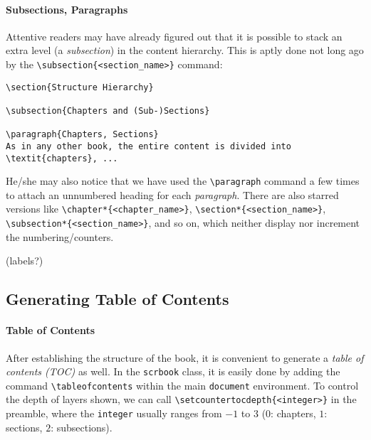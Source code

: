 \paragraph{Subsections, Paragraphs}
Attentive readers may have already figured out that it is possible to stack an extra level (a \textit{subsection}) in the content hierarchy. This is aptly done not long ago by the \texttt{\textbackslash subsection\{<section\_name>\}} command:
\begin{lstlisting}
\section{Structure Hierarchy}

\subsection{Chapters and (Sub-)Sections}

\paragraph{Chapters, Sections}
As in any other book, the entire content is divided into \textit{chapters}, ...
\end{lstlisting}
He/she may also notice that we have used the \texttt{\textbackslash paragraph} command a few times to attach an unnumbered heading for each \textit{paragraph}. There are also starred versions like \texttt{\textbackslash chapter*\{<chapter\_name>\}}, \texttt{\textbackslash section*\{<section\_name>\}}, \texttt{\textbackslash subsection*\{<section\_name>\}}, and so on, which neither display nor increment the numbering/counters.

(labels?)

\subsection{Generating Table of Contents}

\paragraph{Table of Contents}
After establishing the structure of the book, it is convenient to generate a \textit{table of contents (TOC)} as well. In the \verb|scrbook| class, it is easily done by adding the command \texttt{\textbackslash tableofcontents} within the main \verb|document| environment. To control the depth of layers shown, we can call \texttt{\textbackslash setcounter{tocdepth}\allowbreak\{<integer>\}} in the preamble, where the \verb|integer| usually ranges from $-1$ to $3$ ($0$: chapters, $1$: sections, $2$: subsections).

